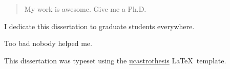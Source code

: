 \documentclass[12pt]{myucthesis}
\begin{document}
\ssp %
\hypersetup{pageanchor=false}

\maketitle
\copyrightpage

\begin{abstract}
My work is awesome. Give me a Ph.D.
\end{abstract}

\hypersetup{pageanchor=true}
\begin{frontmatter}

\begin{dedication}
\null\vfil
{\large
\begin{center}
I dedicate this dissertation to graduate students everywhere.
\end{center}}
\null\vfil
\end{dedication}

\tableofcontents
\listoffigures %
\listoftables %


\begin{acknowledgements}
Too bad nobody helped me.

This dissertation was typeset using the
\href{https://github.com/pkgw/ucastrothesis}{\textsf{ucastrothesis}}
\LaTeX\ template.

\end{acknowledgements}
\end{frontmatter}


{}
\end{document}
